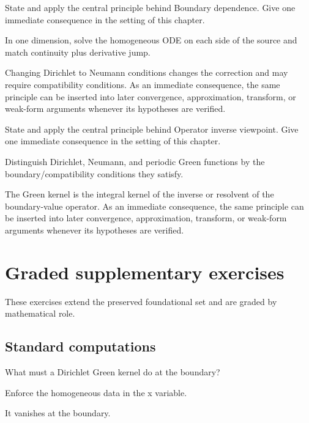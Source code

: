 \begin{exercise}\label{exr:iii25-07}
State and apply the central principle behind Boundary dependence. Give one immediate consequence in the setting of this chapter.
\end{exercise}
\begin{hint}
In one dimension, solve the homogeneous ODE on each side of the source and match continuity plus derivative jump.
\end{hint}
\begin{solution}
Changing Dirichlet to Neumann conditions changes the correction and may require compatibility conditions. As an immediate consequence, the same principle can be inserted into later convergence, approximation, transform, or weak-form arguments whenever its hypotheses are verified.
\end{solution}

\begin{exercise}\label{exr:iii25-08}
State and apply the central principle behind Operator inverse viewpoint. Give one immediate consequence in the setting of this chapter.
\end{exercise}
\begin{hint}
Distinguish Dirichlet, Neumann, and periodic Green functions by the boundary/compatibility conditions they satisfy.
\end{hint}
\begin{solution}
The Green kernel is the integral kernel of the inverse or resolvent of the boundary-value operator. As an immediate consequence, the same principle can be inserted into later convergence, approximation, transform, or weak-form arguments whenever its hypotheses are verified.
\end{solution}


\section{Graded supplementary exercises}
These exercises extend the preserved foundational set and are graded by mathematical role.

\subsection*{Standard computations}

\begin{exercise}\label{exr:iii25-expand-01}
What must a Dirichlet Green kernel do at the boundary?
\end{exercise}
\begin{hint}
Enforce the homogeneous data in the x variable.
\end{hint}
\begin{solution}
It vanishes at the boundary.
\end{solution}

